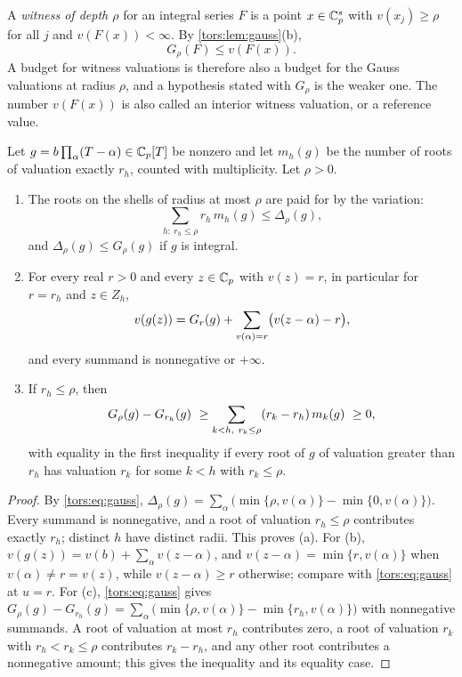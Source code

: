 A \emph{witness of depth $\rho$} for an integral series $F$ is a point $x\in\mathbb{C}_p^s$ with
$v(x_j)\ge\rho$ for all $j$ and $v(F(x))<\infty$. By \cref{tors:lem:gauss}(b),
\begin{equation}\label{tors:eq:witness}
  G_\rho(F)\le v(F(x)) .
\end{equation}
A budget for witness valuations is therefore also a budget for the Gauss valuations at
radius $\rho$, and a hypothesis stated with $G_\rho$ is the weaker one. The number
$v(F(x))$ is also called an interior witness valuation, or a reference value.

\begin{lemma}\label{tors:lem:shells}\label{cost:lem:roots}
Let $g=b\prod_\alpha(T-\alpha)\in\mathbb{C}_p[T]$ be nonzero and let $m_h(g)$ be the number of
roots of valuation exactly $r_h$, counted with multiplicity. Let $\rho>0$.
\begin{enumerate}[label=\textup{(\alph*)}]
\item The roots on the shells of radius at most $\rho$ are paid for by the variation:
  \begin{equation}\label{cost:eq:budget}
    \sum_{h:\ r_h\le\rho}r_h\,m_h(g)\le\Delta_\rho(g),
  \end{equation}
  and $\Delta_\rho(g)\le G_\rho(g)$ if $g$ is integral.
\item For every real $r>0$ and every $z\in\mathbb{C}_p$ with $v(z)=r$, in particular for $r=r_h$
  and $z\in Z_h$,
  \begin{equation}\label{tors:eq:value}\torsalsolabel{cost:eq:shellvalue}
    v(g(z))=G_{r}(g)+\sum_{v(\alpha)=r}\bigl(v(z-\alpha)-r\bigr),
  \end{equation}
  and every summand is nonnegative or $+\infty$.
\item If $r_h\le\rho$, then
  \begin{equation}\label{tors:eq:slack}\torsalsolabel{cost:eq:slack}
    G_\rho(g)-G_{r_h}(g)\ \ge\sum_{k<h,\ r_k\le\rho}(r_k-r_h)\,m_k(g)\ \ge0 ,
  \end{equation}
  with equality in the first inequality if every root of $g$ of valuation greater than
  $r_h$ has valuation $r_k$ for some $k<h$ with $r_k\le\rho$.
\end{enumerate}
\end{lemma}

\begin{proof}
By \eqref{tors:eq:gauss}, $\Delta_\rho(g)=\sum_\alpha\bigl(\min\{\rho,v(\alpha)\}-
\min\{0,v(\alpha)\}\bigr)$. Every summand is nonnegative, and a root of valuation
$r_h\le\rho$ contributes exactly $r_h$; distinct $h$ have distinct radii. This proves (a).
For (b), $v(g(z))=v(b)+\sum_\alpha v(z-\alpha)$, and $v(z-\alpha)=\min\{r,v(\alpha)\}$
when $v(\alpha)\ne r=v(z)$, while $v(z-\alpha)\ge r$ otherwise; compare with
\eqref{tors:eq:gauss} at $u=r$. For (c), \eqref{tors:eq:gauss} gives
$G_\rho(g)-G_{r_h}(g)=\sum_\alpha\bigl(\min\{\rho,v(\alpha)\}-\min\{r_h,v(\alpha)\}\bigr)$
with nonnegative summands. A root of valuation at most $r_h$ contributes zero, a root of
valuation $r_k$ with $r_h<r_k\le\rho$ contributes $r_k-r_h$, and any other root
contributes a nonnegative amount; this gives the inequality and its equality case.
\end{proof}

